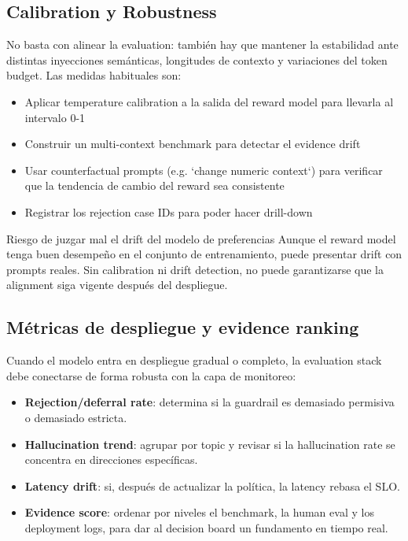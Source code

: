 \subsection{Calibration y Robustness}

No basta con alinear la evaluation: también hay que mantener la estabilidad ante distintas inyecciones semánticas, longitudes de contexto y variaciones del token budget. Las medidas habituales son:

\begin{itemize}
    \item Aplicar temperature calibration a la salida del reward model para llevarla al intervalo 0-1
    \item Construir un multi-context benchmark para detectar el evidence drift
    \item Usar counterfactual prompts (e.g. `change numeric context`) para verificar que la tendencia de cambio del reward sea consistente
    \item Registrar los rejection case IDs para poder hacer drill-down
\end{itemize}

\begin{warningbox}{Riesgo de juzgar mal el drift del modelo de preferencias}
Aunque el reward model tenga buen desempeño en el conjunto de entrenamiento, puede presentar drift con prompts reales. Sin calibration ni drift detection, no puede garantizarse que la alignment siga vigente después del despliegue.
\end{warningbox}

\subsection{Métricas de despliegue y evidence ranking}

Cuando el modelo entra en despliegue gradual o completo, la evaluation stack debe conectarse de forma robusta con la capa de monitoreo:
\begin{itemize}
    \item \textbf{Rejection/deferral rate}: determina si la guardrail es demasiado permisiva o demasiado estricta.
    \item \textbf{Hallucination trend}: agrupar por topic y revisar si la hallucination rate se concentra en direcciones específicas.
    \item \textbf{Latency drift}: si, después de actualizar la política, la latency rebasa el SLO.
    \item \textbf{Evidence score}: ordenar por niveles el benchmark, la human eval y los deployment logs, para dar al decision board un fundamento en tiempo real.
\end{itemize}

